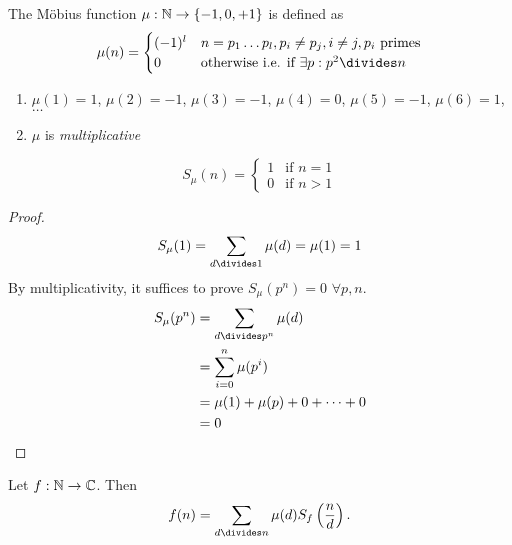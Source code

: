 \documentclass[NumTh.tex]{subfiles}
\begin{document}
\begin{defi}\label{def_0_4_7}
  The Möbius function $\mu: \mathbb{N} \to \{-1,0,+1\}$ is defined as
  \[
	\mu(n) = \begin{cases}
	  (-1)^l & n = p_1 \dots p_l, p_i \neq p_j, i \neq j, p_i \text{ primes} \\
	  0       & \text{otherwise i.e. if } \exists p: p^2 \divides n
	\end{cases}
  \]
\end{defi}

\begin{rem}\hfill
  \begin{enumerate}
    \item $\mu(1) = 1$, $\mu(2) = -1$, $\mu(3) = -1$, $\mu(4) = 0$, $\mu(5) = -1$, $\mu(6) = 1$, $\dots$
    \item $\mu$ is \emph{multiplicative}
  \end{enumerate}
\end{rem}

\begin{lemma}\label{l_0_4_7}
  \[
    S_\mu(n) = \begin{cases}
      1 & \text{if } n=1 \\
      0 & \text{if } n>1
    \end{cases}
  \]
\end{lemma}

\begin{proof}
  \[ S_\mu(1) = \sum_{d\divides 1} \mu(d) = \mu(1) = 1 \]
  By multiplicativity, it suffices to prove $S_\mu(p^n) = 0$ $\forall p,n$.
  \begin{align*}
    S_\mu(p^n) &= \sum_{d\divides p^n} \mu(d) \\
               &= \sum_{i=0}^n \mu(p^i) \\
               &= \mu(1) + \mu(p) + 0 +\dots+0 \\
               &= 0
  \end{align*}
\end{proof}

\begin{theorem}\label{th_0_4_9}
  Let $f: \mathbb{N} \to \mathbb{C}$. Then
  \[ f(n) = \sum_{d\divides n} \mu(d) S_f\left(\frac{n}{d}\right) \text{.}\]
\end{theorem}
\end{document}
